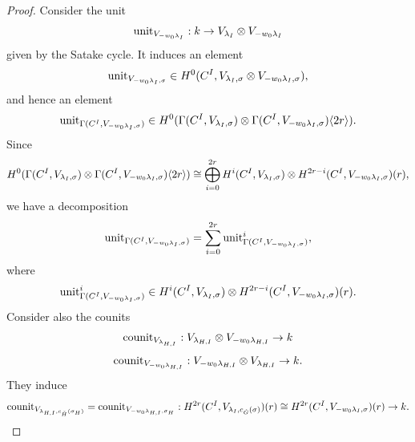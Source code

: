 \documentclass[reqno]{amsart}
\numberwithin{equation}{section}
\numberwithin{equation}{section}
\begin{document}
\begin{proof}

Consider the unit
\[
    \mathrm{unit}_{V_{-w_0\lambda_I}}:k\to V_{\lambda_I}\otimes V_{-w_0\lambda_I}
\]
given by the Satake cycle. It induces an element
\[
    \mathrm{unit}_{V_{-w_0\lambda_I,\sigma}}
    \in H^0(C^I,V_{\lambda_I,\sigma}\otimes V_{-w_0\lambda_I,\sigma}),
\]
and hence an element
\[
    \mathrm{unit}_{\Gamma(C^I,V_{-w_0\lambda_I,\sigma})}
    \in H^0(\Gamma(C^I,V_{\lambda_I,\sigma})\otimes
    \Gamma(C^I,V_{-w_0\lambda_I,\sigma})\langle 2r\rangle).
\]
Since
\[
H^0(\Gamma(C^I,V_{\lambda_I,\sigma})\otimes \Gamma(C^I,V_{-w_0\lambda_I,\sigma})\langle 2r\rangle)
\cong
\bigoplus_{i=0}^{2r} H^i(C^I,V_{\lambda_I,\sigma})\otimes H^{2r-i}(C^I,V_{-w_0\lambda_I,\sigma})(r),
\]
we have a decomposition
\[
    \mathrm{unit}_{\Gamma(C^I,V_{-w_0\lambda_I,\sigma})}
    =\sum_{i=0}^{2r} \mathrm{unit}_{\Gamma(C^I,V_{-w_0\lambda_I,\sigma})}^i,
\]
where
\[
    \mathrm{unit}_{\Gamma(C^I,V_{-w_0\lambda_I,\sigma})}^i
    \in H^i(C^I,V_{\lambda_I,\sigma})\otimes H^{2r-i}(C^I,V_{-w_0\lambda_I,\sigma})(r).
\]
Consider also the counits \[\mathrm{counit}_{V_{\lambda_{H,I}}}:V_{\lambda_{H,I}}\otimes V_{-w_0\lambda_{H,I}}\to k\] \[\mathrm{counit}_{V_{-w_0\lambda_{H,I}}}:V_{-w_0\lambda_{H,I}}\otimes V_{\lambda_{H,I}}\to k.\]
They induce  \begin{equation}\label{eq:counitcartan} \mathrm{counit}_{V_{\lambda_{H,I},c_{\check{H}}(\sigma_H)}} = \mathrm{counit}_{V_{-w_0\lambda_{H,I},\sigma_H}} :H^{2r}(C^I, V_{\lambda_I,c_{\check{G}}(\sigma)})(r)\cong H^{2r}(C^I, V_{-w_0\lambda_I,\sigma})(r) \to k.\end{equation}


\end{proof}
\end{document}
